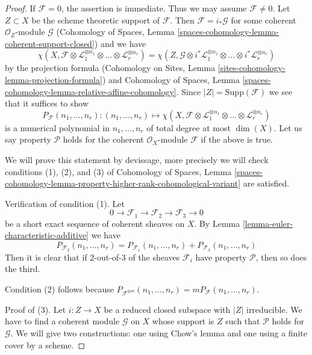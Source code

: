\begin{proof}
If $\mathcal{F} = 0$, the assertion is immediate. Thus we may assume
$\mathcal{F} \not = 0$.
Let $Z \subset X$ be the scheme theoretic support of $\mathcal{F}$.
Then $\mathcal{F} = i_*\mathcal{G}$ for some coherent
$\mathcal{O}_Z$-module $\mathcal{G}$
(Cohomology of Spaces, Lemma
\ref{spaces-cohomology-lemma-coherent-support-closed})
and we have
$$
\chi(X, \mathcal{F} \otimes
\mathcal{L}_1^{\otimes n_1} \otimes \ldots \otimes
\mathcal{L}_r^{\otimes n_r}) =
\chi(Z, \mathcal{G} \otimes
i^*\mathcal{L}_1^{\otimes n_1} \otimes \ldots \otimes
i^*\mathcal{L}_r^{\otimes n_r})
$$
by the projection formula
(Cohomology on Sites, Lemma \ref{sites-cohomology-lemma-projection-formula})
and Cohomology of Spaces, Lemma
\ref{spaces-cohomology-lemma-relative-affine-cohomology}.
Since $|Z| = \text{Supp}(\mathcal{F})$ we see that it suffices
to show
$$
P_\mathcal{F}(n_1, \ldots, n_r) :
(n_1, \ldots, n_r)
\longmapsto
\chi(X, \mathcal{F} \otimes
\mathcal{L}_1^{\otimes n_1} \otimes \ldots \otimes
\mathcal{L}_r^{\otimes n_r})
$$
is a numerical polynomial in $n_1, \ldots, n_r$ of total degree at
most $\dim(X)$. Let us say property $\mathcal{P}$ holds for the
coherent $\mathcal{O}_X$-module $\mathcal{F}$ if the above is true.

\medskip\noindent
We will prove this statement by devissage, more precisely we will
check conditions (1), (2), and (3) of
Cohomology of Spaces, Lemma
\ref{spaces-cohomology-lemma-property-higher-rank-cohomological-variant}
are satisfied.

\medskip\noindent
Verification of condition (1). Let
$$
0 \to \mathcal{F}_1 \to \mathcal{F}_2 \to \mathcal{F}_3 \to 0
$$
be a short exact sequence of coherent sheaves on $X$.
By Lemma \ref{lemma-euler-characteristic-additive} we have
$$
P_{\mathcal{F}_2}(n_1, \ldots, n_r) =
P_{\mathcal{F}_1}(n_1, \ldots, n_r) +
P_{\mathcal{F}_3}(n_1, \ldots, n_r)
$$
Then it is clear that if 2-out-of-3 of the sheaves $\mathcal{F}_i$
have property $\mathcal{P}$, then so does the third.

\medskip\noindent
Condition (2) follows because
$P_{\mathcal{F}^{\oplus m}}(n_1, \ldots, n_r) =
mP_\mathcal{F}(n_1, \ldots, n_r)$.

\medskip\noindent
Proof of (3). Let $i : Z \to X$ be a reduced closed subspace with
$|Z|$ irreducible. We have to find a coherent module $\mathcal{G}$
on $X$ whose support is $Z$ such that $\mathcal{P}$ holds for $\mathcal{G}$.
We will give two constructions: one using Chow's lemma and one
using a finite cover by a scheme.


\end{proof}
